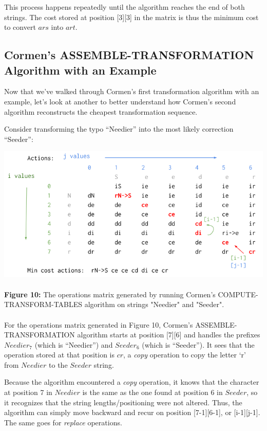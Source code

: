 \documentclass[12pt,letterpaper]{article}
\begin{document}
This process happens repeatedly until the algorithm reaches the end of both strings. The cost stored at position [3][3] in the matrix is thus the minimum cost to convert $ars$ into $art$.

\subsection{Cormen’s ASSEMBLE-TRANSFORMATION Algorithm with an Example}
Now that we’ve walked through Cormen’s first transformation algorithm with an example, let’s look at another to better understand how Cormen’s second algorithm reconstructs the cheapest transformation sequence.

Consider transforming the typo “Needier” into the most likely correction “Seeder”:

\includegraphics[scale=0.7]{images/fig10example2.png}
\paragraph{}
\begin{footnotesize}
    \noindent\textbf{Figure 10:} The operations matrix generated by running Cormen's COMPUTE-TRANSFORM-TABLES algorithm on strings "Needier" and "Seeder".
\end{footnotesize}
\paragraph{}

For the operations matrix generated in Figure 10, Cormen’s ASSEMBLE-TRANSFORMATION algorithm starts at position [7][6] and handles the prefixes $Needier_7$ (which is “Needier”) and $Seeder_6$ (which is “Seeder”). It sees that the operation stored at that position is $cr$, a \textit{copy} operation to copy the letter ‘r’ from $Needier$ to the $Seeder$ string.

Because the algorithm encountered a \textit{copy} operation, it knows that the character at position 7 in $Needier$ is the same as the one found at position 6 in $Seeder$, so it recognizes that the string lengths/positioning were not altered. Thus, the algorithm can simply move backward and recur on position [7-1][6-1], or [i-1][j-1]. The same goes for \textit{replace} operations.
\end{document}
